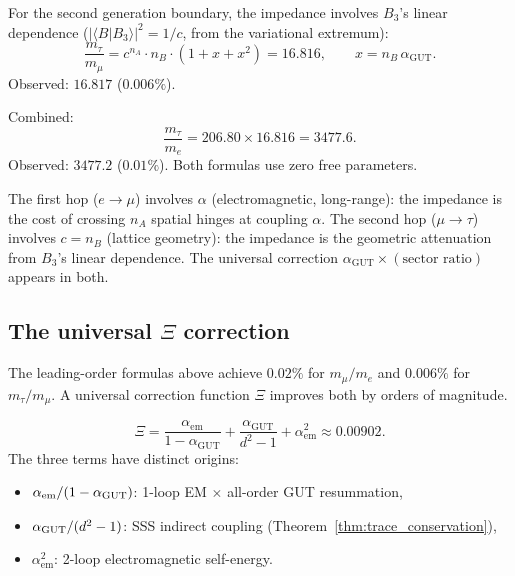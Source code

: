 For the second generation boundary, the impedance involves $B_3$'s linear dependence ($|\langle B|B_3\rangle|^2 = 1/c$, from the variational extremum):
\begin{equation}
\label{eq:tau_mu}
\boxed{\frac{m_\tau}{m_\mu} = c^{n_A}\cdot n_B \cdot \left(1 + x + x^2\right) = 16.816, \qquad x = n_B\,\alpha_\mathrm{GUT}.}
\end{equation}
Observed: $16.817$ ($0.006\%$).

Combined:
\begin{equation}
\label{eq:tau_e}
\frac{m_\tau}{m_e} = 206.80 \times 16.816 = 3477.6.
\end{equation}
Observed: $3477.2$ ($0.01\%$).  Both formulas use zero free parameters.

\begin{remark}
The first hop ($e \to \mu$) involves $\alpha$ (electromagnetic, long-range): the impedance is the cost of crossing $n_A$ spatial hinges at coupling $\alpha$.  The second hop ($\mu \to \tau$) involves $c = n_B$ (lattice geometry): the impedance is the geometric attenuation from $B_3$'s linear dependence.  The universal correction $\alpha_\mathrm{GUT} \times (\text{sector ratio})$ appears in both.
\end{remark}

\subsection{The universal $\Xi$ correction}
\label{sec:xi_correction}

The leading-order formulas above achieve $0.02\%$ for $m_\mu/m_e$ and $0.006\%$ for $m_\tau/m_\mu$.  A universal correction function $\Xi$ improves both by orders of magnitude.

\begin{definition}
\begin{equation}
\Xi = \frac{\alpha_\mathrm{em}}{1 - \alpha_\mathrm{GUT}} + \frac{\alpha_\mathrm{GUT}}{d^2 - 1} + \alpha_\mathrm{em}^2 \approx 0.00902.
\end{equation}
The three terms have distinct origins:
\begin{itemize}
\item $\alpha_\mathrm{em}/(1 - \alpha_{\mathrm{GUT}})$: 1-loop EM $\times$ all-order GUT resummation,
\item $\alpha_{\mathrm{GUT}}/(d^2 - 1)$: SSS indirect coupling (Theorem~\ref{thm:trace_conservation}),
\item $\alpha_\mathrm{em}^2$: 2-loop electromagnetic self-energy.
\end{itemize}
\end{definition}

